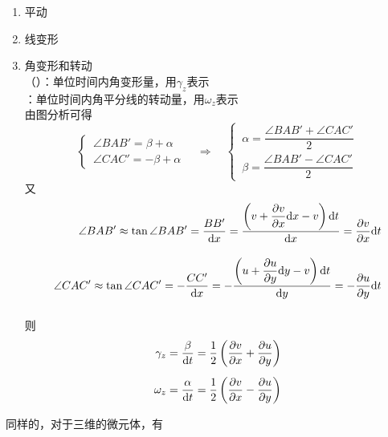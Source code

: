 \begin{enumerate}
	\item 平动\\
	
	\item 线变形\\
	
	\item 角变形和转动\\
	\hspace*{1em} （）：单位时间内角变形量，用$\gamma_z$表示\\
	\hspace*{1em} ：单位时间内角平分线的转动量，用$\omega_z$表示\\
	由图分析可得
	\begin{equation*}
		\begin{cases}
			\, \angle BAB' = \beta + \alpha \\
			\, \angle CAC' = -\beta + \alpha
		\end{cases}
		\quad \Rightarrow \quad 
		\begin{cases}
			\, \alpha = \dfrac{\angle BAB' + \angle CAC'}{2}\\[0.5em]
			\, \beta = \dfrac{\angle BAB' - \angle CAC'}{2}
		\end{cases}
	\end{equation*}
	又
	\begin{equation*}
		\begin{aligned}
			\angle BAB' \approx \tan \angle BAB' = \dfrac{BB'}{{\rm{d}} x} = \dfrac{\left(v + \dfrac{\partial v}{\partial x} {\rm{d}} x - v\right){\rm{d}} t}{{\rm{d}} x} = \dfrac{\partial v}{\partial x}{\rm{d}} t \\[1em]
			\angle CAC' \approx \tan \angle CAC' = -\dfrac{CC'}{{\rm{d}} x} = -\dfrac{\left(u + \dfrac{\partial u}{\partial y} {\rm{d}} y - v\right){\rm{d}} t}{{\rm{d}} y} = - \dfrac{\partial u}{\partial y}{\rm{d}} t \\[1em]
		\end{aligned}
	\end{equation*}
	则
	\begin{equation}
		\begin{aligned}
			\gamma_z =  \dfrac{\beta}{{\rm{d}} t} = \dfrac{1}{2}\left(\dfrac{\partial v}{\partial x} + \dfrac{\partial u}{\partial y}\right)\\[0.5em]
			\omega_z =  \dfrac{\alpha }{{\rm{d}} t} = \dfrac{1}{2} \left(\dfrac{\partial v}{\partial x} - \dfrac{\partial u}{\partial y}\right)
		\end{aligned}
	\end{equation}
\end{enumerate}
同样的，对于三维的微元体，有

